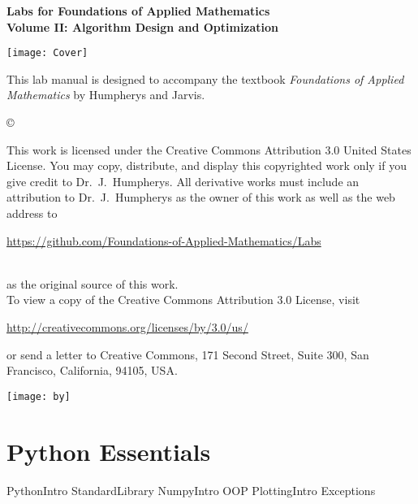 \documentclass[nociteref]{SIAM-GH-book}
\begin{document}

\thispagestyle{empty} %

\begin{center}
{\huge \bf Labs for Foundations of Applied Mathematics} \\
\vspace{5mm}
{\Large \bf Volume II: Algorithm Design and Optimization}
\vspace{20mm}

\texttt{[image: Cover]}
\end{center}
\frontmatter



\begin{thepreface} %

This lab manual is designed to accompany the textbook \emph{Foundations of Applied Mathematics} by Humpherys and Jarvis.

\vfill
\copyright{This work is licensed under the Creative Commons Attribution 3.0 United States
License.  You may copy, distribute, and display this copyrighted work only if you give
credit to Dr.~J.~Humpherys. All derivative works must include an attribution to Dr.~J.~Humpherys as the owner of this work as well as the web address to
\\\centerline{\url{https://github.com/Foundations-of-Applied-Mathematics/Labs}}\\as the original source of this work.
\\To view a copy of the Creative Commons Attribution 3.0 License, visit
\\\centerline{\url{http://creativecommons.org/licenses/by/3.0/us/}} or send a letter to Creative Commons, 171 Second Street, Suite 300, San Francisco, California, 94105, USA.}

\vfill
\centering\texttt{[image: by]}
\vfill
\end{thepreface}

\setcounter{tocdepth}{1}
\tableofcontents

\mainmatter %

\part{Python Essentials} %
{PythonIntro}
{StandardLibrary}
{NumpyIntro}
{OOP}
{PlottingIntro}
{Exceptions}
\end{document}

